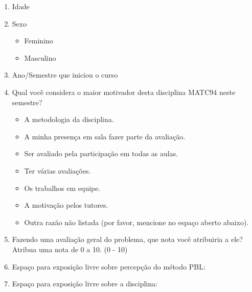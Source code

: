 \acresetall
\label{form-disciplina-concluinte}
\begin{enumerate}
\item{Idade}
\item{Sexo}
\begin{itemize}
	\item{Feminino}
	\item{Masculino}
\end{itemize}
\item{Ano/Semestre que iniciou o curso}
\AfirmacaoLikert{\LikertCA{}}
\AfirmacaoLikert{\LikertCB{}}
\AfirmacaoLikert{\LikertCC{}}
\AfirmacaoLikert{\LikertCD{}}
\AfirmacaoLikert{\LikertCE{}}
\AfirmacaoLikert{\LikertCF{}}
\AfirmacaoLikertA{\LikertCG{}}
\item{Qual você considera o maior motivador desta disciplina MATC94 neste semestre?}
\begin{itemize}
\item{A metodologia da disciplina.}
\item{A minha presença em sala fazer parte da avaliação.}
\item{Ser avaliado pela participação em todas as aulas.}
\item{Ter várias avaliações.}
\item{Os trabalhos em equipe.}
\item{A motivação pelos tutores.}
\item{Outra razão não listada (por favor, mencione no espaço aberto abaixo).}
\end{itemize}
\AfirmacaoLikert{\LikertCH{}}
\AfirmacaoLikert{\LikertCI{}}
\AfirmacaoLikert{\LikertCJ{}}
\AfirmacaoLikert{\LikertCK{}}
\AfirmacaoLikert{\LikertCL{}}
\AfirmacaoLikert{\LikertCM{}}
\AfirmacaoLikert{\LikertCN{}}
\item{Fazendo uma avaliação geral do problema, que nota você
atribuiria a ele? Atribua uma nota de 0 a 10. (0 - 10)}
\item{Espaço para exposição livre sobre percepção do método PBL:}
\item{Espaço para exposição livre sobre a disciplina:}
\end{enumerate}
